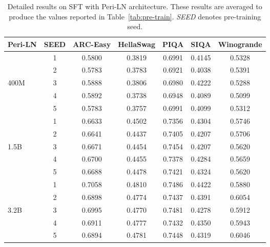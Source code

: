 \begin{table}[ht!]
\vskip -0.1in
\small
    \centering
        \caption{Detailed results on SFT with Peri-LN architecture. These results are averaged to produce the values reported in Table~\ref{tab:pre-train}. \textit{SEED} denotes pre-training seed.}
    \begin{tabular}{lcccccc}
    \toprule
        Peri-LN & SEED & ARC-Easy & HellaSwag & PIQA & SIQA & Winogrande \\ 
        \toprule
        ~ & 1 & 0.5800 & 0.3819 & 0.6991 & 0.4145 & 0.5328 \\ 
        ~ & 2 & 0.5783 & 0.3783 & 0.6921 & 0.4038 & 0.5391 \\ 
        400M & 3 & 0.5888 & 0.3806 & 0.6980 & 0.4222 & 0.5288 \\ 
        ~ & 4 & 0.5892	&0.3738&	0.6948&	0.4089	&0.5099 \\ 
        ~ & 5 & 0.5783 & 0.3757 & 0.6991 & 0.4099 & 0.5312 \\ 
    \midrule
        ~ & 1 & 0.6633 & 0.4502 & 0.7356 & 0.4304 & 0.5746 \\ 
        ~ & 2 & 0.6641 & 0.4437 & 0.7405 & 0.4207 & 0.5706 \\ 
        1.5B & 3 & 0.6671 & 0.4454 & 0.7454 & 0.4207 & 0.5620 \\ 
        ~ & 4 & 0.6700	&0.4455	&0.7378& 0.4284&	0.5659\\ 
        ~ & 5 & 0.6688 & 0.4478 & 0.7421 & 0.4324 & 0.5620 \\
        \midrule
        ~ & 1 & 0.7058 & 0.4810 & 0.7486 & 0.4422 & 0.5880 \\ 
        ~ & 2 & 0.6898 & 0.4774 & 0.7437 & 0.4391 & 0.6054 \\ 
        3.2B & 3 & 0.6995 & 0.4770 & 0.7481 & 0.4278 & 0.5912 \\ 
        ~ & 4 & 0.6911 & 0.4777 & 0.7432 & 0.4350 & 0.5943 \\ 
        ~ & 5 & 0.6894 & 0.4781 & 0.7448 & 0.4319 & 0.6046 \\ 
        \bottomrule
    \end{tabular}
    \vskip -0.1in
\end{table}


